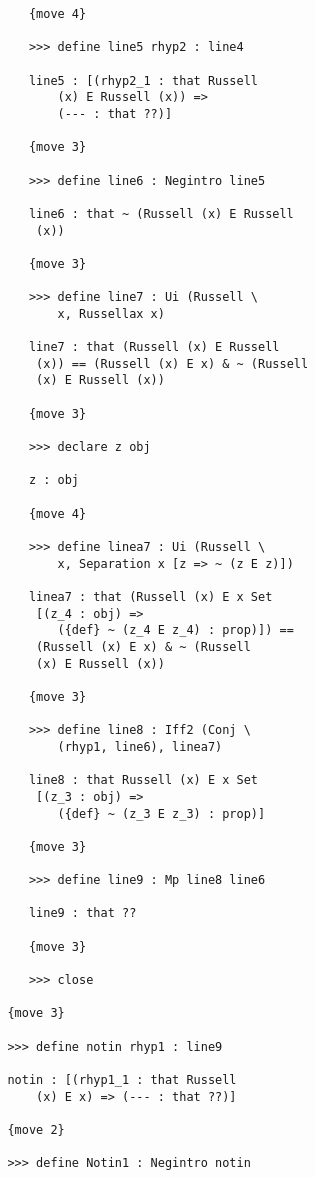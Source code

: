 \documentclass[12pt]{article}
\begin{document}
\begin{verbatim}
            {move 4}

            >>> define line5 rhyp2 : line4

            line5 : [(rhyp2_1 : that Russell 
                (x) E Russell (x)) => 
                (--- : that ??)]

            {move 3}

            >>> define line6 : Negintro line5

            line6 : that ~ (Russell (x) E Russell 
             (x))

            {move 3}

            >>> define line7 : Ui (Russell \
                x, Russellax x)

            line7 : that (Russell (x) E Russell 
             (x)) == (Russell (x) E x) & ~ (Russell 
             (x) E Russell (x))

            {move 3}

            >>> declare z obj

            z : obj

            {move 4}

            >>> define linea7 : Ui (Russell \
                x, Separation x [z => ~ (z E z)])

            linea7 : that (Russell (x) E x Set 
             [(z_4 : obj) => 
                ({def} ~ (z_4 E z_4) : prop)]) == 
             (Russell (x) E x) & ~ (Russell 
             (x) E Russell (x))

            {move 3}

            >>> define line8 : Iff2 (Conj \
                (rhyp1, line6), linea7)

            line8 : that Russell (x) E x Set 
             [(z_3 : obj) => 
                ({def} ~ (z_3 E z_3) : prop)]

            {move 3}

            >>> define line9 : Mp line8 line6

            line9 : that ??

            {move 3}

            >>> close

         {move 3}

         >>> define notin rhyp1 : line9

         notin : [(rhyp1_1 : that Russell 
             (x) E x) => (--- : that ??)]

         {move 2}

         >>> define Notin1 : Negintro notin


\end{verbatim}
\end{document}
